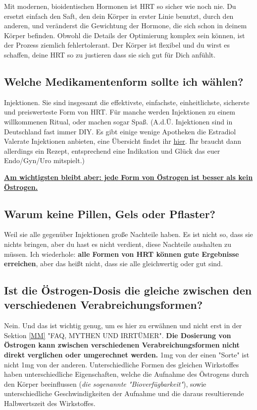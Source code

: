\documentclass{article}
\begin{document}
Mit modernen, bioidentischen Hormonen ist HRT so sicher wie noch nie. Du ersetzt einfach den Saft, den dein Körper in erster Linie benutzt, durch den anderen, und veränderst die Gewichtung der Hormone, die sich schon in deinem Körper befinden. Obwohl die Details der Optimierung komplex sein können, ist der Prozess ziemlich fehlertolerant. Der Körper ist flexibel und du wirst es schaffen, deine HRT so zu justieren dass sie sich gut für Dich anfühlt.

\subsection{Welche Medikamentenform sollte ich wählen?}

Injektionen. Sie sind insgesamt die effektivste, einfachste, einheitlichste, sicherste und preiswerteste Form von HRT. Für manche werden Injektionen zu einem willkommenen Ritual, oder machen sogar Spaß. (A.d.Ü. Injektionen sind in Deutschland fast immer DIY. Es gibt einige wenige Apotheken die Estradiol Valerate Injektionen anbieten, eine Übersicht findet ihr \href{https://transdb.de/search?type=pharmacy&offers=eInjection}{hier}. Ihr braucht dann allerdings ein Rezept, entsprechend eine Indikation und Glück das euer Endo/Gyn/Uro mitspielt.)

\noindent\underline{\textbf{Am wichtigsten bleibt aber: jede Form von Östrogen ist besser als kein Östrogen.}}

\subsection{Warum keine Pillen, Gels oder Pflaster?}

Weil sie alle gegenüber Injektionen große Nachteile haben. Es ist nicht so, dass sie nichts bringen, aber du hast es nicht verdient, diese Nachteile aushalten zu müssen. Ich wiederhole: \textbf{alle Formen von HRT können gute Ergebnisse erreichen}, aber das heißt nicht, dass sie alle gleichwertig oder gut sind.

\subsection{Ist die Östrogen-Dosis die gleiche zwischen den verschiedenen Verabreichungsformen?}

Nein. Und das ist wichtig genug, um es hier zu erwähnen und nicht erst in der Sektion \ref{MM} "FAQ, MYTHEN UND IRRTÜMER". \textbf{Die Dosierung von Östrogen kann zwischen verschiedenen Verabreichungsformen nicht direkt verglichen oder umgerechnet werden.} 1mg von der einen "Sorte" ist nicht 1mg von der anderen. Unterschiedliche Formen des gleichen Wirkstoffes haben unterschiedliche Eigenschaften, welche die Aufnahme des Östrogens durch den Körper beeinflussen (\textit{die sogenannte "Bioverfügbarkeit"}), sowie unterschiedliche Geschwindigkeiten der Aufnahme und die daraus resultierende Halbwertszeit des Wirkstoffes.
\end{document}
